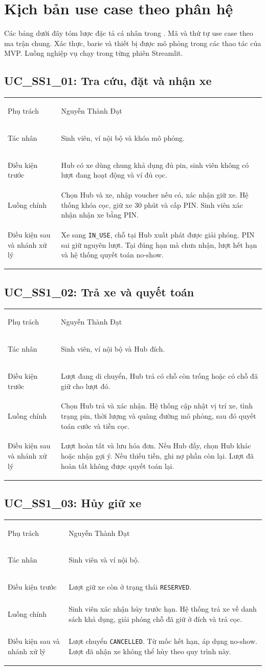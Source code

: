 \section{Kịch bản use case theo phân hệ}
Các bảng dưới đây tóm lược đặc tả cá nhân trong .
Mã và thứ tự use case theo ma trận chung. Xác thực, barie và thiết bị được mô phỏng
trong các thao tác của MVP. Luồng nghiệp vụ chạy trong từng phiên Streamlit.

\newcommand{\casebrief}[7]{%
  \subsection[#1: #2]{#1: #2}%
  \noindent\begin{tabularx}{\linewidth}{@{}>{\bfseries\raggedright\arraybackslash}p{.22\linewidth}X@{}}
  \toprule
  Phụ trách & #3 \\
  Tác nhân & #4 \\
  Điều kiện trước & #5 \\
  Luồng chính & #6 \\
  \midrule
  Điều kiện sau và nhánh xử lý & #7 \\
  \bottomrule
  \end{tabularx}\par}

\casebrief{UC\_SS1\_01}{Tra cứu, đặt và nhận xe}
{Nguyễn Thành Đạt}{Sinh viên, ví nội bộ và khóa mô phỏng.}
{Hub có xe dùng chung khả dụng đủ pin, sinh viên không có lượt đang hoạt động và ví đủ cọc.}
{Chọn Hub và xe, nhập voucher nếu có, xác nhận giữ xe. Hệ thống khóa cọc, giữ xe 30 phút và cấp PIN. Sinh viên xác nhận nhận xe bằng PIN.}
{Xe sang \texttt{IN\_USE}, chỗ tại Hub xuất phát được giải phóng. PIN sai giữ nguyên lượt. Tại đúng hạn mà chưa nhận, lượt hết hạn và hệ thống quyết toán no-show.}

\casebrief{UC\_SS1\_02}{Trả xe và quyết toán}
{Nguyễn Thành Đạt}{Sinh viên, ví nội bộ và Hub đích.}
{Lượt đang di chuyển, Hub trả có chỗ còn trống hoặc có chỗ đã giữ cho lượt đó.}
{Chọn Hub trả và xác nhận. Hệ thống cập nhật vị trí xe, tình trạng pin, thời lượng và quãng đường mô phỏng, sau đó quyết toán cước và tiền cọc.}
{Lượt hoàn tất và lưu hóa đơn. Nếu Hub đầy, chọn Hub khác hoặc nhận gợi ý. Nếu thiếu tiền, ghi nợ phần còn lại. Lượt đã hoàn tất không được quyết toán lại.}

\casebrief{UC\_SS1\_03}{Hủy giữ xe}
{Nguyễn Thành Đạt}{Sinh viên và ví nội bộ.}
{Lượt giữ xe còn ở trạng thái \texttt{RESERVED}.}
{Sinh viên xác nhận hủy trước hạn. Hệ thống trả xe về danh sách khả dụng, giải phóng chỗ đã giữ ở đích và trả cọc.}
{Lượt chuyển \texttt{CANCELLED}. Từ mốc hết hạn, áp dụng no-show. Lượt đã nhận xe không thể hủy theo quy trình này.}


